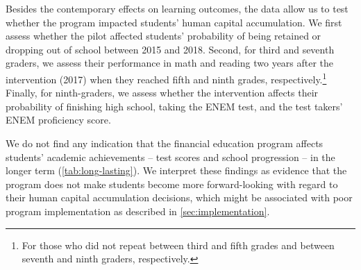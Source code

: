 




Besides the contemporary effects on learning outcomes, the data allow us to test whether the program impacted students' human capital accumulation. We first assess whether the pilot affected students' probability of being retained or dropping out of school between 2015 and 2018. Second, for third and seventh graders, we assess their performance in math and reading two years after the intervention (2017) when they reached fifth and ninth grades, respectively.\footnote{For those who did not repeat between third and fifth grades and between seventh and ninth graders, respectively.} Finally, for ninth-graders, we assess whether the intervention affects their probability of finishing high school, taking the ENEM test, and the test takers' ENEM proficiency score. 

We do not find any indication that the financial education program affects students' academic achievements -- test scores and school progression -- in the longer term (\autoref{tab:long-lasting}). We interpret these findings as evidence that the program does not make students become more forward-looking with regard to their human capital accumulation decisions, which might be associated with poor program implementation as described in \autoref{sec:implementation}.

